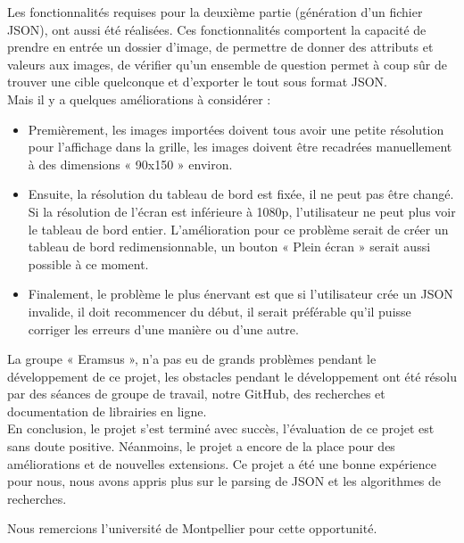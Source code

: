 \documentclass[a4paper]{article}
\begin{document}
Les fonctionnalités requises pour la deuxième partie (génération d’un fichier JSON), ont aussi été réalisées. Ces fonctionnalités comportent la capacité de prendre en entrée un dossier d’image, de permettre de donner des attributs et valeurs aux images, de vérifier qu'un ensemble de question permet à coup sûr de trouver une cible quelconque et d’exporter le tout sous format JSON.\\
Mais il y a quelques améliorations à considérer :
\begin{itemize}
    \item Premièrement, les images importées doivent tous avoir une petite résolution pour l’affichage dans la grille, les images doivent être recadrées manuellement à des dimensions « 90x150 » environ.
    \item Ensuite, la résolution du tableau de bord est fixée, il ne peut pas être changé. Si la résolution de l’écran est inférieure à 1080p, l’utilisateur ne peut plus voir le tableau de bord entier. L’amélioration pour ce problème serait de créer un tableau de bord redimensionnable, un bouton « Plein écran » serait aussi possible à ce moment.
    \item Finalement, le problème le plus énervant est que si l’utilisateur crée un JSON invalide, il doit recommencer du début, il serait préférable qu'il puisse corriger les erreurs d'une manière ou d'une autre.\\
\end{itemize}

La groupe « Eramsus », n’a pas eu de grands problèmes pendant le développement de ce projet, les obstacles pendant le développement ont été résolu par des séances de groupe de travail, notre GitHub, des recherches et documentation de librairies en ligne.\\
 
En conclusion, le projet s'est terminé avec succès, l’évaluation de ce projet est sans doute positive. Néanmoins, le projet a encore de la place pour des améliorations et de nouvelles extensions. Ce projet a été une bonne expérience pour nous, nous avons appris plus sur le parsing de JSON et les algorithmes de recherches.\\
\begin{center}
    Nous remercions l'université de Montpellier pour cette opportunité.
\end{center}
\end{document}
